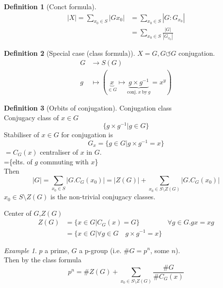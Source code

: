 \documentclass{article}
\newcommand{\abs}[1]{\left|#1\right|}
\theoremstyle{definition}
\newtheorem{definition}{Definition}[section]
\theoremstyle{remark}
\theoremstyle{example}
\newtheorem*{example}{Example}
\begin{document}
		\begin{definition}[Conct formula]
			\begin{align*}
				\abs{X}=\sum_{x_0 \in S} \abs{Gx_0}&=\sum_{x_0 \in S}\abs{G:G_{x_0}}\\
				&=\sum_{x_0 \in S}\frac{\abs{G}}{\abs{G_{x_0}}}
			\end{align*}
		\end{definition}
		\begin{definition}[Special case (class formula)]
			$X=G, G \circlearrowleft G$ conjugation.
			\begin{align*}
				G & \to S(G)\\
				g & \mapsto \left( \underbrace{x}_{\in G} \mapsto \underbrace{g \times g^{-1}}_{\mathrm{conj.}\ x\ \mathrm{by}\ g}=x^y \right)
			\end{align*}
		\end{definition}
		\begin{definition}[Orbits of conjugation]
			Conjugation class\\
			Conjugacy class of $x \in G$ \[ \{g \times g^{-1} | g \in G \} \]
			Stabiliser of $x \in G$ for conjugation is \[G_x=\{g \in G | g \times g^{-1}=x\}\]
			$=C_G(x)$ centraliser of $x$ in $G$.\\
			=\{elts. of $g$ commuting with $x$\}\\
			
			Then \[\abs{G}=\sum_{x_0 \in S}\abs{G.C_G(x_0)}=\abs{Z(G)}+\sum_{x_0 \in S \setminus Z(G)}\abs{G.C_G(x_0)}\]
			$x_0 \in S \setminus Z(G)$ is the non-trivial conjugacy classes.
		\end{definition}
	
		Center of $G$,$Z(G)$
		\begin{align*}
		Z(G)&=\{x \in G|C_G(x)=G \} & \forall g\in G. gx=xg\\
		& = \{x \in G | \forall g \in G\quad g \times g^{-1}=x \}
		\end{align*}
		
		\begin{example}
			$p$ a prime, $G$ a p-group (i.e. $\#G=p^n$, some $n$).\\
			Then by the class formula \[p^n=\#Z(G)+\sum_{x_0 \in S \setminus Z(G)} \frac{\#G}{\#C_G(x)}\]
		\end{example}
		\pagebreak
\end{document}
